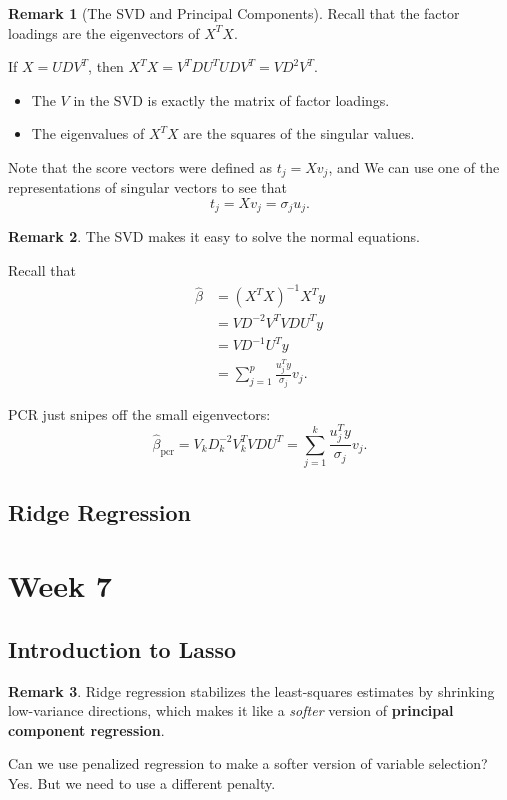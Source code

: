 \documentclass[11pt]{article}
\theoremstyle{definition}
\newtheorem{remark}{Remark}[section]
\numberwithin{equation}{section}
\begin{document}
\begin{remark}[The SVD and Principal Components]
 Recall that the factor loadings are the eigenvectors of $X^TX$.

 If $X=UDV^T$, then $X^TX=V^TDU^TUDV^T=VD^2V^T$.
 \begin{itemize}
 \item The $V$ in the SVD is exactly the matrix of factor loadings.
 \item The eigenvalues of $X^TX$ are the squares of the singular values.
 \end{itemize}
 Note that the score vectors were defined as $t_j=Xv_j$, and We can use one of the representations of singular vectors to see that
 \begin{equation}
   t_j=Xv_j=\sigma_j u_j.
 \end{equation}
\end{remark}

\begin{remark}
  The SVD makes it easy to solve the normal equations.

  Recall that
  \begin{align}
    \hat\beta &= (X^TX)^{-1}X^Ty\\
    &=VD^{-2}V^TVDU^Ty\\
    &=VD^{-1}U^Ty\\
    &=\sum^p_{j=1}\frac{u_j^T y}{\sigma_j}v_j.
  \end{align}

  PCR just snipes off the small eigenvectors:
  \begin{equation}
    \hat\beta_{\text{pcr}}=V_kD_k^{-2}V_k^TVDU^T=\sum^k_{j=1}\frac{u_j^Ty}{\sigma_j}v_j.
  \end{equation}
\end{remark}

\subsection{Ridge Regression}



\newpage

\section{Week 7}
\subsection{Introduction to Lasso}

\begin{remark}
  Ridge regression stabilizes the least-squares estimates by shrinking low-variance directions, which makes it like a \textit{softer} version of \textbf{principal component regression}.
\end{remark}

\begin{writenotes}
  Can we use penalized regression to make a softer version of variable selection? Yes. But we need to use a different penalty.
\end{writenotes}
\end{document}
